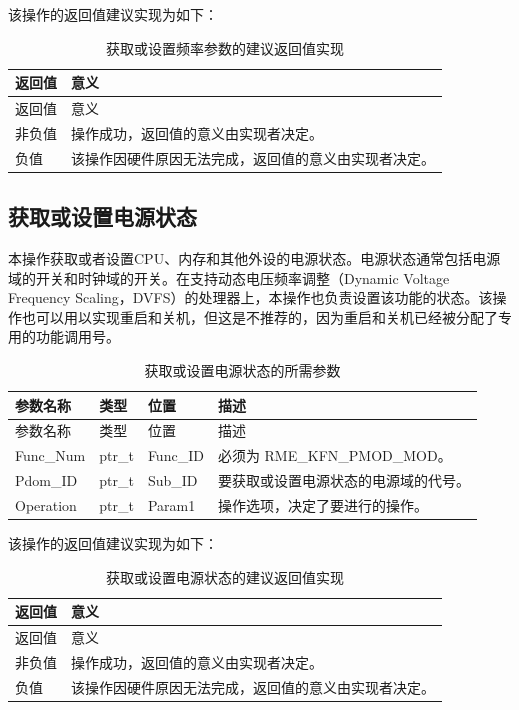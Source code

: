 该操作的返回值建议实现为如下：

\begin{xltabular}{\textwidth}{@{}>{\hsize\raggedright\arraybackslash}X>{\hsize\raggedright\arraybackslash}X@{}}
\caption{获取或设置频率参数的建议返回值实现}\label{tab:8-52-get-or-set-frequency-suggested-return-values}\\
\toprule
返回值 & 意义\tabularnewline
\endfirsthead
\toprule
返回值 & 意义\tabularnewline
\midrule
\endhead
\bottomrule
\endlastfoot
    非负值 & 操作成功，返回值的意义由实现者决定。\tabularnewline
    负值 & 该操作因硬件原因无法完成，返回值的意义由实现者决定。\tabularnewline
\end{xltabular}

\subsection{获取或设置电源状态}\label{subsec:8-get-or-set-power-state}

本操作获取或者设置CPU、内存和其他外设的电源状态。电源状态通常包括电源域的开关和时钟域的开关。在支持动态电压频率调整（Dynamic
Voltage Frequency
Scaling，DVFS）的处理器上，本操作也负责设置该功能的状态。该操作也可以用以实现重启和关机，但这是不推荐的，因为重启和关机已经被分配了专用的功能调用号。

\begin{xltabular}{\textwidth}{@{}>{\hsize\raggedright\arraybackslash}X>{\hsize\raggedright\arraybackslash}X>{\hsize\raggedright\arraybackslash}X>{\hsize\raggedright\arraybackslash}X@{}}
\caption{获取或设置电源状态的所需参数}\label{tab:8-53-get-or-set-power-state-parameters}\\
\toprule
参数名称 & 类型 & 位置 & 描述\tabularnewline
\endfirsthead
\toprule
参数名称 & 类型 & 位置 & 描述\tabularnewline
\midrule
\endhead
\bottomrule
\endlastfoot
Func\_Num & ptr\_t & Func\_ID & 必须为 RME\_KFN\_PMOD\_MOD。\tabularnewline
Pdom\_ID & ptr\_t & Sub\_ID &
要获取或设置电源状态的电源域的代号。\tabularnewline
Operation & ptr\_t & Param1 &
操作选项，决定了要进行的操作。\tabularnewline
\end{xltabular}

该操作的返回值建议实现为如下：

\begin{xltabular}{\textwidth}{@{}>{\hsize\raggedright\arraybackslash}X>{\hsize\raggedright\arraybackslash}X@{}}
\caption{获取或设置电源状态的建议返回值实现}\label{tab:8-54-get-or-set-power-state-suggested-return-values}\\
\toprule
返回值 & 意义\tabularnewline
\endfirsthead
\toprule
返回值 & 意义\tabularnewline
\midrule
\endhead
\bottomrule
\endlastfoot
    非负值 & 操作成功，返回值的意义由实现者决定。\tabularnewline
    负值 & 该操作因硬件原因无法完成，返回值的意义由实现者决定。\tabularnewline
\end{xltabular}

